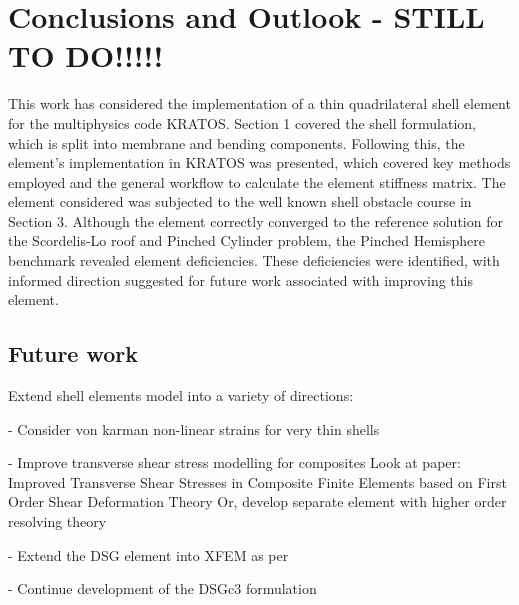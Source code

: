 
\chapter{Conclusions and Outlook - STILL TO DO!!!!!}
\label{chap:conclusions}
\renewcommand{\Thema}{Conclusion}

This work has considered the implementation of a thin quadrilateral shell element for the multiphysics code KRATOS. Section 1 covered the shell formulation, which is split into membrane and bending components. Following this, the element's implementation in KRATOS was presented, which covered key methods employed and the general workflow to calculate the element stiffness matrix. The element considered was subjected to the well known shell obstacle course in Section 3. Although the element correctly converged to the reference solution for the Scordelis-Lo roof and Pinched Cylinder problem, the Pinched Hemisphere benchmark revealed element deficiencies. These deficiencies were identified, with informed direction suggested  for future work associated with improving this element. 

\section{Future work}

Extend shell elements model into a variety of directions:

- Consider von karman non-linear strains for very thin shells

- Improve transverse shear stress modelling for composites
Look at paper: Improved Transverse Shear Stresses in Composite Finite Elements based on First Order Shear Deformation Theory
Or, develop separate element with higher order resolving theory

- Extend the DSG element into XFEM as per \cite{DSG_XFEM_2015}

- Continue development of the DSGc3 formulation